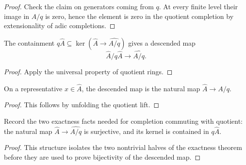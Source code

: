 \begin{proof}
  Check the claim on generators coming from \(q\).  At every finite level their
  image in \(A/q\) is zero, hence the element is zero in the quotient
  completion by extensionality of adic completions.
\end{proof}

\begin{definition}
  \label{def:completed_quotient_to_quotient_completion}
  The containment \(q\widehat A\subseteq\ker(\widehat A\to\widehat{A/q})\)
  gives a descended map
  \[
    \widehat A/q\widehat A\to\widehat{A/q}.
  \]
\end{definition}

\begin{proof}
  Apply the universal property of quotient rings.
\end{proof}

\begin{lemma}
  \label{lem:completed_quotient_to_quotient_completion_mk}
  On a representative \(x\in\widehat A\), the descended map is the natural map
  \(\widehat A\to\widehat{A/q}\).
\end{lemma}

\begin{proof}
  This follows by unfolding the quotient lift.
\end{proof}

\begin{definition}
  \label{def:completed_quotient_map_source_facts}
  Record the two exactness facts needed for completion commuting with quotient:
  the natural map \(\widehat A\to\widehat{A/q}\) is surjective, and its kernel
  is contained in \(q\widehat A\).
\end{definition}

\begin{proof}
  This structure isolates the two nontrivial halves of the exactness theorem
  before they are used to prove bijectivity of the descended map.
\end{proof}

